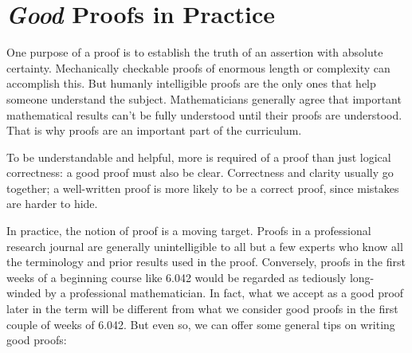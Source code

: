 \section{\textit{Good} Proofs in Practice}

One purpose of a proof is to establish the truth of an assertion with
absolute certainty.  Mechanically checkable proofs of enormous length or
complexity can accomplish this.  But humanly intelligible proofs are the
only ones that help someone understand the subject.  Mathematicians
generally agree that important mathematical results can't be fully
understood until their proofs are understood.  That is why proofs are an
important part of the curriculum.

To be understandable and helpful, more is required of a proof than just
logical correctness: a good proof must also be clear.  Correctness and
clarity usually go together; a well-written proof is more likely to be a
correct proof, since mistakes are harder to hide.

In practice, the notion of proof is a moving target.  Proofs in a
professional research journal are generally unintelligible to all but a
few experts who know all the terminology and prior results used in the
proof.  Conversely, proofs in the first weeks of a beginning course like
6.042 would be regarded as tediously long-winded by a professional
mathematician.  In fact, what we accept as a good proof later in the term
will be different from what we consider good proofs in the first couple of
weeks of 6.042.  But even so, we can offer some general tips on writing
good proofs:


